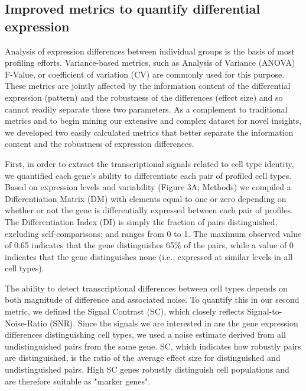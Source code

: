 \subsection{Improved metrics to quantify differential expression}

Analysis of expression differences between individual groups is the basis of most profiling efforts. Variance-based metrics, such as Analysis of Variance (ANOVA) F-Value, or coefficient of variation (CV) are commonly used for this purpose. These metrics are jointly affected by the information content of the differential expression (pattern) and the robustness of the differences (effect size) and so cannot readily separate these two parameters. As a complement to traditional metrics and to begin mining our extensive and complex dataset for novel insights, we developed two easily calculated metrics that better separate the information content and the robustness of expression differences. 

First, in order to extract the transcriptional signals related to cell type identity, we quantified each gene's ability to differentiate each pair of profiled cell types. Based on expression levels and variability (Figure 3A; Methods) we compiled a Differentiation Matrix (DM) with elements equal to one or zero depending on whether or not the gene is differentially expressed between each pair of profiles. The Differentiation Index (DI) is simply the fraction of pairs distinguished, excluding self-comparisons; and ranges from 0 to 1. The maximum observed value of 0.65 indicates that the gene distinguishes 65\% of the pairs, while a value of 0 indicates that the gene distinguishes none (i.e., expressed at similar levels in all cell types).

The ability to detect transcriptional differences between cell types depends on both magnitude of difference and associated noise. To quantify this in our second metric, we defined the Signal Contrast (SC), which closely reflects Signal-to-Noise-Ratio (SNR). Since the signals we are interested in are the gene expression differences distinguishing cell types, we used a noise estimate derived from all undistinguished pairs from the same gene. SC, which indicates how robustly pairs are distinguished, is the ratio of the average effect size for distinguished and undistinguished pairs. High SC genes robustly distinguish cell populations and are therefore suitable as "marker genes". 

